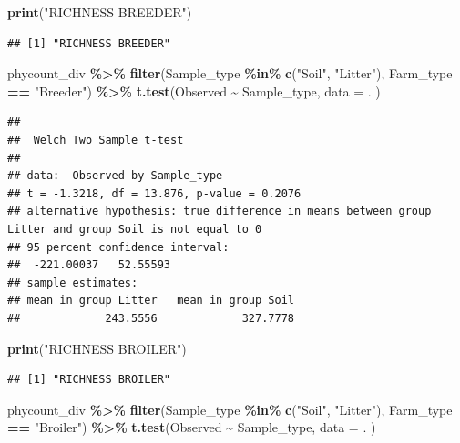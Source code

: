 \documentclass[
]{article}
\newenvironment{Shaded}{\begin{snugshade}}{\end{snugshade}}
\newcommand{\AttributeTok}[1]{\textcolor[rgb]{0.13,0.29,0.53}{#1}}
\newcommand{\FunctionTok}[1]{\textcolor[rgb]{0.13,0.29,0.53}{\textbf{#1}}}
\newcommand{\NormalTok}[1]{#1}
\newcommand{\SpecialCharTok}[1]{\textcolor[rgb]{0.81,0.36,0.00}{\textbf{#1}}}
\newcommand{\StringTok}[1]{\textcolor[rgb]{0.31,0.60,0.02}{#1}}
\begin{document}
\begin{Shaded}
\begin{Highlighting}[]
\FunctionTok{print}\NormalTok{(}\StringTok{"RICHNESS BREEDER"}\NormalTok{)}
\end{Highlighting}
\end{Shaded}

\begin{verbatim}
## [1] "RICHNESS BREEDER"
\end{verbatim}

\begin{Shaded}
\begin{Highlighting}[]
\NormalTok{phycount\_div }\SpecialCharTok{\%\textgreater{}\%}
  \FunctionTok{filter}\NormalTok{(Sample\_type }\SpecialCharTok{\%in\%} \FunctionTok{c}\NormalTok{(}\StringTok{"Soil"}\NormalTok{, }\StringTok{"Litter"}\NormalTok{),}
\NormalTok{         Farm\_type }\SpecialCharTok{==} \StringTok{"Breeder"}\NormalTok{) }\SpecialCharTok{\%\textgreater{}\%}
  \FunctionTok{t.test}\NormalTok{(Observed }\SpecialCharTok{\textasciitilde{}}\NormalTok{ Sample\_type, }
       \AttributeTok{data =}\NormalTok{ .}
\NormalTok{       )}
\end{Highlighting}
\end{Shaded}

\begin{verbatim}
## 
##  Welch Two Sample t-test
## 
## data:  Observed by Sample_type
## t = -1.3218, df = 13.876, p-value = 0.2076
## alternative hypothesis: true difference in means between group Litter and group Soil is not equal to 0
## 95 percent confidence interval:
##  -221.00037   52.55593
## sample estimates:
## mean in group Litter   mean in group Soil 
##             243.5556             327.7778
\end{verbatim}

\begin{Shaded}
\begin{Highlighting}[]
\FunctionTok{print}\NormalTok{(}\StringTok{"RICHNESS BROILER"}\NormalTok{)}
\end{Highlighting}
\end{Shaded}

\begin{verbatim}
## [1] "RICHNESS BROILER"
\end{verbatim}

\begin{Shaded}
\begin{Highlighting}[]
\NormalTok{phycount\_div }\SpecialCharTok{\%\textgreater{}\%}
  \FunctionTok{filter}\NormalTok{(Sample\_type }\SpecialCharTok{\%in\%} \FunctionTok{c}\NormalTok{(}\StringTok{"Soil"}\NormalTok{, }\StringTok{"Litter"}\NormalTok{),}
\NormalTok{         Farm\_type }\SpecialCharTok{==} \StringTok{"Broiler"}\NormalTok{) }\SpecialCharTok{\%\textgreater{}\%}
  \FunctionTok{t.test}\NormalTok{(Observed }\SpecialCharTok{\textasciitilde{}}\NormalTok{ Sample\_type, }
       \AttributeTok{data =}\NormalTok{ .}
\NormalTok{       )}
\end{Highlighting}
\end{Shaded}
\end{document}
